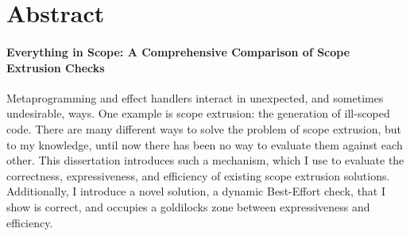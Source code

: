 \chapter*{Abstract}

\subsubsection*{Everything in Scope: A Comprehensive Comparison of Scope Extrusion Checks}
Metaprogramming and effect handlers interact in unexpected, and sometimes undesirable, ways. One example is scope extrusion: the generation of ill-scoped code. There are many different ways to solve the problem of scope extrusion, but to my knowledge, until now there has been no way to evaluate them against each other. This dissertation introduces such a mechanism, which I use to evaluate the correctness, expressiveness, and efficiency of existing scope extrusion solutions. Additionally, I introduce a novel solution, a dynamic Best-Effort check, that I show is correct, and occupies a goldilocks zone between expressiveness and efficiency. 